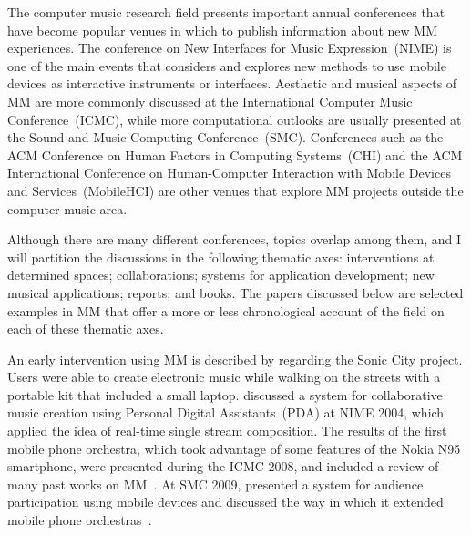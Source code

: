 The computer music research field presents important annual conferences that have become popular venues in which to publish information about new MM experiences.
The conference on New Interfaces for Music Expression~(NIME) is one of the main events that considers and explores new methods to use mobile devices as interactive instruments or interfaces.
Aesthetic and musical aspects of MM are more commonly discussed at the International Computer Music Conference~(ICMC), while more computational outlooks are usually presented at the Sound and Music Computing Conference~(SMC).
Conferences such as the ACM Conference on Human Factors in Computing Systems~(CHI) and the ACM International Conference on Human-Computer Interaction with Mobile Devices and Services~(MobileHCI) are other venues that explore MM projects outside the computer music area.

Although there are many different conferences, topics overlap among them, and I will partition the discussions in the following thematic axes: interventions at determined spaces; collaborations; systems for application development; new musical applications; reports; and books.
The papers discussed below are selected examples in MM that offer a more or less chronological account of the field on each of these thematic axes.

An early intervention using MM is described by \cite{Gaye2003sonic} regarding the Sonic City project.
Users were able to create electronic music while walking on the streets with a portable kit that included a small laptop.
\cite{Tanaka2004mobile} discussed a system for collaborative music creation using Personal Digital Assistants~(PDA) at NIME 2004, which applied the idea of real-time single stream composition.
The results of the first mobile phone orchestra, which took advantage of some features of the Nokia N95 smartphone, were presented during the ICMC 2008, and included a review of many past works on MM~\citep{Wang2008domobilephones}.
At SMC 2009, \citeauthor{Tahiroglu2009towards} presented a system for audience participation using mobile devices and discussed the way in which it extended mobile phone orchestras~\citep{Tahiroglu2009towards}.

